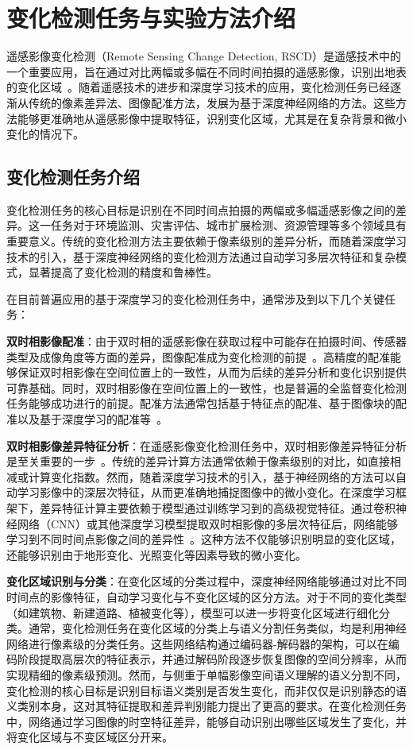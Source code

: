 
\chapter{变化检测任务与实验方法介绍}
遥感影像变化检测（Remote Sensing Change Detection, RSCD）是遥感技术中的一个重要应用，旨在通过对比两幅或多幅在不同时间拍摄的遥感影像，识别出地表的变化区域~\cite{YGXB202407012}。随着遥感技术的进步和深度学习技术的应用，变化检测任务已经逐渐从传统的像素差异法、图像配准方法，发展为基于深度神经网络的方法。这些方法能够更准确地从遥感影像中提取特征，识别变化区域，尤其是在复杂背景和微小变化的情况下。

\section{变化检测任务介绍}

变化检测任务的核心目标是识别在不同时间点拍摄的两幅或多幅遥感影像之间的差异。这一任务对于环境监测、灾害评估、城市扩展检测、资源管理等多个领域具有重要意义。传统的变化检测方法主要依赖于像素级别的差异分析，而随着深度学习技术的引入，基于深度神经网络的变化检测方法通过自动学习多层次特征和复杂模式，显著提高了变化检测的精度和鲁棒性。

在目前普遍应用的基于深度学习的变化检测任务中，通常涉及到以下几个关键任务：

\textbf{双时相影像配准}：由于双时相的遥感影像在获取过程中可能存在拍摄时间、传感器类型及成像角度等方面的差异，图像配准成为变化检测的前提~\cite{WHCH202405001}。高精度的配准能够保证双时相影像在空间位置上的一致性，从而为后续的差异分析和变化识别提供可靠基础。同时，双时相影像在空间位置上的一致性，也是普遍的全监督变化检测任务能够成功进行的前提。配准方法通常包括基于特征点的配准、基于图像块的配准以及基于深度学习的配准等~\cite{YGXB202406011}。

\textbf{双时相影像差异特征分析}：在遥感影像变化检测任务中，双时相影像差异特征分析是至关重要的一步~\cite{CHXB202207001}。传统的差异计算方法通常依赖于像素级别的对比，如直接相减或计算变化指数。然而，随着深度学习技术的引入，基于神经网络的方法可以自动学习影像中的深层次特征，从而更准确地捕捉图像中的微小变化。在深度学习框架下，差异特征计算主要依赖于模型通过训练学习到的高级视觉特征。通过卷积神经网络（CNN）或其他深度学习模型提取双时相影像的多层次特征后，网络能够学习到不同时间点影像之间的差异性~\cite{chen_spatial-temporal_2020,lin_transition_2023,shi_deeply_2022}。这种方法不仅能够识别明显的变化区域，还能够识别由于地形变化、光照变化等因素导致的微小变化。

\textbf{变化区域识别与分类}：在变化区域的分类过程中，深度神经网络能够通过对比不同时间点的影像特征，自动学习变化与不变化区域的区分方法。对于不同的变化类型（如建筑物、新建道路、植被变化等），模型可以进一步将变化区域进行细化分类。通常，变化检测任务在变化区域的分类上与语义分割任务类似，均是利用神经网络进行像素级的分类任务。这些网络结构通过编码器-解码器的架构，可以在编码阶段提取高层次的特征表示，并通过解码阶段逐步恢复图像的空间分辨率，从而实现精细的像素级预测。然而，与侧重于单幅影像空间语义理解的语义分割不同，变化检测的核心目标是识别目标语义类别是否发生变化，而非仅仅是识别静态的语义类别本身，这对其特征提取和差异判别能力提出了更高的要求。在变化检测任务中，网络通过学习图像的时空特征差异，能够自动识别出哪些区域发生了变化，并将变化区域与不变区域区分开来。 

